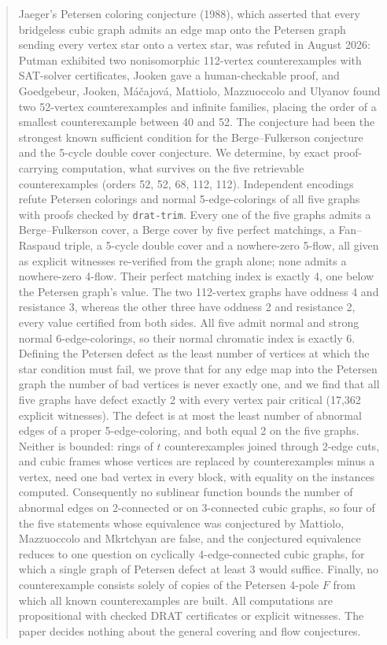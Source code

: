 \begin{abstract}
Jaeger's Petersen coloring conjecture (1988), which asserted that every bridgeless cubic graph
admits an edge map onto the Petersen graph sending every vertex star onto a vertex star, was
refuted in August 2026: Putman exhibited two nonisomorphic 112-vertex counterexamples with
SAT-solver certificates, Jooken gave a human-checkable proof, and Goedgebeur, Jooken,
M\'a\v{c}ajov\'a, Mattiolo, Mazzuoccolo and Ulyanov found two 52-vertex counterexamples and
infinite families, placing the order of a smallest counterexample between 40 and 52. The
conjecture had been the strongest known sufficient condition for the Berge--Fulkerson
conjecture and the 5-cycle double cover conjecture. We determine, by exact proof-carrying
computation, what survives on the five retrievable counterexamples (orders 52, 52, 68, 112, 112).
Independent encodings refute Petersen colorings and normal 5-edge-colorings of all five graphs
with proofs checked by \texttt{drat-trim}. Every one of the five graphs admits a Berge--Fulkerson
cover, a Berge cover by five perfect matchings, a Fan--Raspaud triple, a 5-cycle double cover and
a nowhere-zero 5-flow, all given as explicit witnesses re-verified from the graph alone; none
admits a nowhere-zero 4-flow. Their perfect matching index is exactly 4, one below the Petersen
graph's value. The two 112-vertex graphs have oddness 4 and resistance 3, whereas the other three
have oddness 2 and resistance 2, every value certified from both sides. All five admit normal and
strong normal 6-edge-colorings, so their normal chromatic index is exactly 6. Defining the
Petersen defect as the least number of vertices at which the star condition must fail, we prove
that for any edge map into the Petersen graph the number of bad vertices is never exactly one,
and we find that all five graphs have defect exactly 2 with every vertex pair critical
(17{,}362 explicit witnesses). The defect is at most the least number of abnormal edges of a
proper 5-edge-coloring, and both equal 2 on the five graphs. Neither is bounded: rings of $t$
counterexamples joined through 2-edge cuts, and cubic frames whose vertices are replaced by
counterexamples minus a vertex, need one bad vertex in every block, with equality on the
instances computed. Consequently no sublinear function bounds the number of abnormal edges on
2-connected or on 3-connected cubic graphs, so four of the five statements whose equivalence was
conjectured by Mattiolo, Mazzuoccolo and Mkrtchyan are false, and the conjectured equivalence
reduces to one question on cyclically 4-edge-connected cubic graphs, for which a single graph of
Petersen defect at least 3 would suffice. Finally, no counterexample consists solely of copies of
the Petersen 4-pole $F$ from which all known counterexamples are built. All computations are
propositional with checked DRAT certificates or explicit witnesses. The paper decides nothing
about the general covering and flow conjectures.
\end{abstract}
